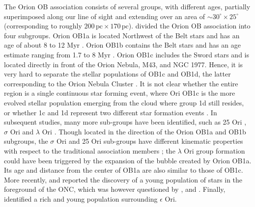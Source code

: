 \documentclass[twocolumn]{aa}
\begin{document}
The Orion OB association consists of several groups, with different ages, partially superimposed along our line of sight \citep{Bally2008} and extending over an area of $\sim 30^{\circ} \times 25^{\circ}$ (corresponding to roughly $200 \, \mathrm{pc}\times 170 \, \mathrm{pc}$). 
\cite{Blaauw1964} divided the Orion OB association into four subgroups. Orion OB1a is located Northwest of the Belt stars and has an age of about 8 to 12 Myr \citep{Brown1994}. Orion OB1b contains the Belt stars and has an age estimate ranging from 1.7 to 8 Myr \citep{Brown1994, Bally2008}. Orion OB1c \citep[estimated age from 2 to 6 Myr]{Bally2008} includes the Sword stars and  is located directly in front of the Orion Nebula, M43, and NGC 1977. Hence, it is very hard to separate the stellar populations of OB1c and OB1d, the latter corresponding to the Orion Nebula Cluster \citep[ONC, see e.g.][]{DaRio2014}. It is not clear whether the entire region is a single continuous star forming event, where Ori OB1c is the more evolved stellar population emerging from the cloud where group 1d still resides, or whether 1c and 1d represent two different star formation events \citep[see e.g.][]{Muench2008}. 
In subsequent studies, many more sub-groups have been identified, such as  25 Ori \citep{Briceno2007}, $\sigma$ Ori \citep{Walter2008} and $\lambda$ Ori \citep{Mathieu2008}. Though located in the direction of the Orion OB1a and OB1b subgroups, the $\sigma$ Ori and 25 Ori sub-groups have different kinematic properties with respect to the traditional association members \citep{Briceno2007, Jeffries2006}; the $\lambda$ Ori group \citep{Mathieu2008} formation could have been triggered by the expansion of the bubble created by Orion OB1a. Its age and distance from the center of OB1a are also similar to those of OB1c.
More recently, \cite{Alves2012} and \cite{Bouy2014}  reported the discovery of a young population of stars in the foreground of the ONC, which was however questioned by \citet{DaRio2016}, \cite{Fang2017} and \cite{Kounkel2017b}. Finally, \cite{Kubiak2016} identified a rich and young population surrounding $\epsilon$ Ori. 
\end{document}
